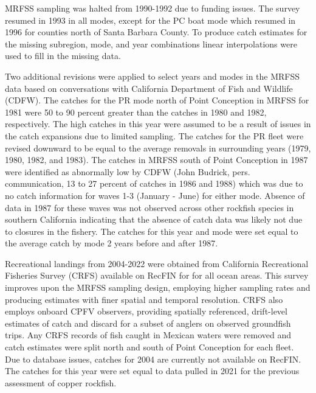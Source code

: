 \documentclass[11pt,
  english,
  letterpaper,
]{article}
\begin{document}
MRFSS sampling was halted from 1990-1992 due to funding issues. The survey resumed in 1993 in all modes, except for the PC boat mode which resumed in 1996 for counties north of Santa Barbara County. To produce catch estimates for the missing subregion, mode, and year combinations linear interpolations were used to fill in the missing data.

Two additional revisions were applied to select years and modes in the MRFSS data based on conversations with California Department of Fish and Wildlife (CDFW). The catches for the PR mode north of Point Conception in MRFSS for 1981 were 50 to 90 percent greater than the catches in 1980 and 1982, respectively. The high catches in this year were assumed to be a result of issues in the catch expansions due to limited sampling. The catches for the PR fleet were revised downward to be equal to the average removals in surrounding years (1979, 1980, 1982, and 1983). The catches in MRFSS south of Point Conception in 1987 were identified as abnormally low by CDFW (John Budrick, pers. communication, 13 to 27 percent of catches in 1986 and 1988) which was due to no catch information for waves 1-3 (January - June) for either mode. Absence of data in 1987 for these waves was not observed across other rockfish species in southern California indicating that the absence of catch data was likely not due to closures in the fishery. The catches for this year and mode were set equal to the average catch by mode 2 years before and after 1987.

Recreational landings from 2004-2022 were obtained from California Recreational Fisheries Survey (CRFS) available on RecFIN for for all ocean areas. This survey improves upon the MRFSS sampling design, employing higher sampling rates and producing estimates with finer spatial and temporal resolution. CRFS also employs onboard CPFV observers, providing spatially referenced, drift-level estimates of catch and discard for a subset of anglers on observed groundfish trips. Any CRFS records of fish caught in Mexican waters were removed and catch estimates were split north and south of Point Conception for each fleet. Due to database issues, catches for 2004 are currently not available on RecFIN. The catches for this year were set equal to data pulled in 2021 for the previous assessment of copper rockfish.
\end{document}
